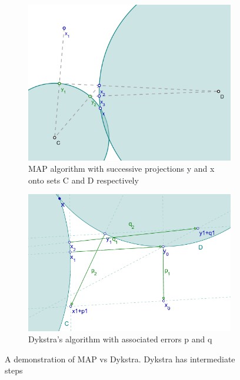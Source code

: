 \documentclass[hidelinks]{article}
\begin{document}
\begin{figure}[h]
    \centering
    
    \begin{subfigure}[t]{0.49\textwidth}
        \centering
        \includegraphics[width=1\textwidth]{MAP_wiki.png}
        \caption{MAP algorithm with successive projections y and x onto sets C and D respectively}
        \label{fig:wikiMAP}
    \end{subfigure}
    \hfill
    \begin{subfigure}[t]{0.49\textwidth}
        \centering
        \includegraphics[width=1\textwidth]{Dykstra_wiki.png}
        \caption{Dykstra's algorithm with associated errors p and q}
        \label{fig:wikiDykstra}
    \end{subfigure}
    \caption{A demonstration of MAP vs Dykstra. Dykstra has intermediate steps}
    \label{fig:wiki}
\end{figure}
\end{document}
